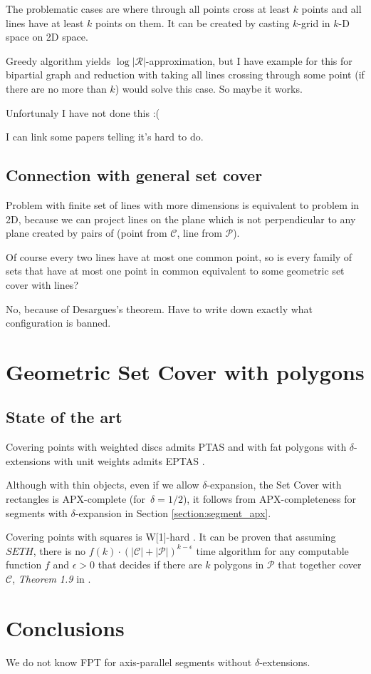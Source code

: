 \documentclass[en]{pracamgr}
\newcommand{\points}{\mathcal{C}}
\newcommand{\sets}{\mathcal{P}}
\theoremstyle{plain}
\theoremstyle{definition}
\begin{document}
The problematic cases are where through all points
cross at least $k$ points and all lines have at least $k$ points on them.
It can be created by casting $k$-grid in $k$-D space on 2D space.

Greedy algorithm yields $\log |\mathcal{R}|$-approximation,
but I have example for this for bipartial graph and
reduction with taking all lines crossing through some point
(if there are no more than $k$) would solve this case.
So maybe it works.

Unfortunaly I have not done this :(

I can link some papers telling it's hard to do.

\section{Connection with general set cover}
Problem with finite set of lines with more dimensions
is equivalent
to problem in 2D, because we can project
lines on the plane which is not perpendicular
to any plane created by pairs of
(point from $\mathcal{C}$, line from $\mathcal{P}$).

Of course every two lines have at most one common point,
so is every family of sets that have at most one point
in common equivalent to some geometric set cover with lines?

No, because of Desargues's theorem.
Have to write down exactly what configuration is banned.


\chapter{Geometric Set Cover with polygons}
\section{State of the art}

Covering points with weighted discs admits PTAS \cite{li}
and with fat polygons with $\delta$-extensions with unit weights
admits EPTAS \cite{harpeled12}.

Although with thin objects, even if we allow $\delta$-expansion,
the Set Cover with rectangles
is APX-complete (for~$\delta = 1/2$),
it follows from APX-completeness for segments with $\delta$-expansion
in Section \ref{section:segment_apx}.

Covering points with squares is W[1]-hard \cite{marx05}.
It can be proven that assuming $SETH$,
there is no $f(k)\cdot(|\points|+|\sets|)^{k-\epsilon}$ time algorithm
for any computable function $f$ and $\epsilon >0$ that decides if there
are $k$ polygons in $\sets$ that together cover $\points$,
\textit{Theorem 1.9} in \cite{voronoi}.








\chapter{Conclusions}
We do not know FPT for axis-parallel segments without $\delta$-extensions.



\end{document}
